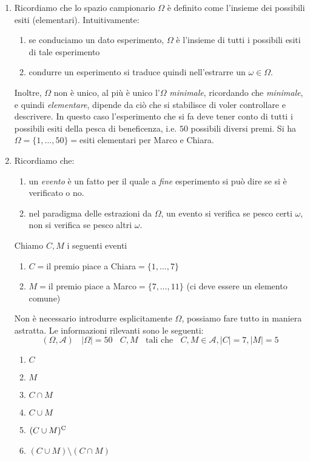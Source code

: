 \begin{enumerate}
	\item Ricordiamo che lo spazio campionario $\Omega $ è definito come l'insieme dei possibili esiti (elementari). Intuitivamente:
\begin{enumerate}
	\item se conduciamo un dato esperimento, $\Omega $ è l'insieme di tutti i possibili esiti di tale esperimento
	\item condurre un esperimento si traduce quindi nell'estrarre un $\omega \in \Omega $.
\end{enumerate}

Inoltre, $\Omega $ non è unico, al più è unico l'$\Omega $ \textit{minimale}, ricordando che \textit{minimale}, e quindi \textit{elementare}, dipende da ciò che si stabilisce di voler controllare e descrivere. In questo caso l'esperimento che si fa deve tener conto di tutti i possibili esiti della pesca di beneficenza, i.e. $50$ possibili diversi premi. Si ha $\Omega =\{1,\dots ,50\} =$esiti elementari per Marco e Chiara.
	\item Ricordiamo che:
\begin{enumerate}
	\item un \textit{evento} è un fatto per il quale a \textit{fine} esperimento si può dire se si è verificato o no.
	\item nel paradigma delle estrazioni da $\Omega $, un evento si verifica se pesco certi $\omega $, non si verifica se pesco altri $\omega $.
\end{enumerate}

Chiamo $C,M$ i seguenti eventi
\begin{enumerate}
	\item $C=$il premio piace a Chiara$=\{1,\dots ,7\}$
	\item $M=$il premio piace a Marco$=\{7,\dots ,11\}$ (ci deve essere un elemento comune)
\end{enumerate}

\begin{oss}
Non è necessario introdurre esplicitamente $\Omega $, possiamo fare tutto in maniera astratta. Le informazioni rilevanti sono le seguenti:
\begin{equation*}
( \Omega ,\mathcal{A}) \ \ \ \ | \Omega | =50\ \ \ \ C,M\ \ \ \ \text{tali che} \ \ \ \ C,M\in \mathcal{A} ,| C| =7,| M| =5
\end{equation*}
\end{oss}
\begin{enumerate}
	\item $C$
	\item $M$
	\item $C\cap M$
	\item $C\cup M$
	\item $( C\cup M)^{\mathrm{C}}$
	\item $( C\cup M) \setminus ( C\cap M)$
\end{enumerate}


\end{enumerate}
